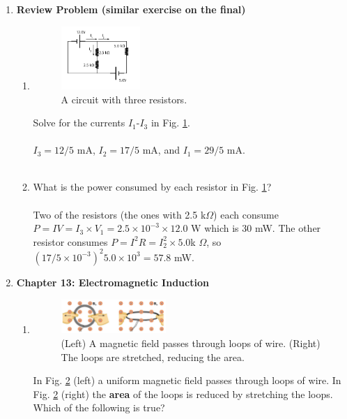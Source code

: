 \documentclass[10pt]{article}
\begin{document}
\begin{enumerate}
\item \textbf{Review Problem (similar exercise on the final)}
\begin{enumerate}
\item 
\begin{figure}[ht]
\centering
\includegraphics[width=0.3\textwidth]{iV.pdf}
\caption{\label{fig:circuit1} A circuit with three resistors.}
\end{figure}
Solve for the currents $I_1$-$I_3$ in Fig. \ref{fig:circuit1}. \\ \\ $I_3 = 12/5$ mA, $I_2 = 17/5$ mA, and $I_1 = 29/5$ mA. \\ \\
\item What is the power consumed by each resistor in Fig. \ref{fig:circuit1}? \\ \\ Two of the resistors (the ones with 2.5 k$\Omega$) each consume $P = IV = I_3 \times V_1 = 2.5 \times 10^{-3} \times 12.0$ W which is 30 mW.  The other resistor consumes $P = I^2 R = I_2^2 \times 5.0 $k $\Omega$, so $(17/5 \times 10^{-3})^2 5.0 \times 10^3 = 57.8$ mW.
\end{enumerate} \clearpage
\item \textbf{Chapter 13: Electromagnetic Induction}
\begin{enumerate}
\item
\begin{figure}
\centering
\includegraphics[width=0.4\textwidth]{flux1.png}
\caption{\label{fig:flux1} (Left) A magnetic field passes through loops of wire.  (Right) The loops are stretched, reducing the area.}
\end{figure}
In Fig. \ref{fig:flux1} (left) a uniform magnetic field passes through loops of wire.  In Fig. \ref{fig:flux1} (right) the \textbf{area} of the loops is reduced by stretching the loops.  Which of the following is true?

\end{enumerate}
\end{enumerate}
\end{document}
